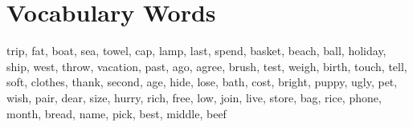 \documentclass{article}
\begin{document}
\renewcommand{\familydefault}{\sfdefault}
\onehalfspacing
\fontsize{12pt}{14pt}\selectfont

\section*{Vocabulary Words}
\begin{addmargin}[1em]{1em}
trip, fat, boat, sea, towel, cap, lamp, last, spend, basket, beach, ball, holiday, ship, west, throw, vacation, past, ago, agree, brush, test, weigh, birth, touch, tell, soft, clothes, thank, second, age, hide, lose, bath, cost, bright, puppy, ugly, pet, wish, pair, dear, size, hurry, rich, free, low, join, live, store, bag, rice, phone, month, bread, name, pick, best, middle, beef
\end{addmargin}
\end{document}

